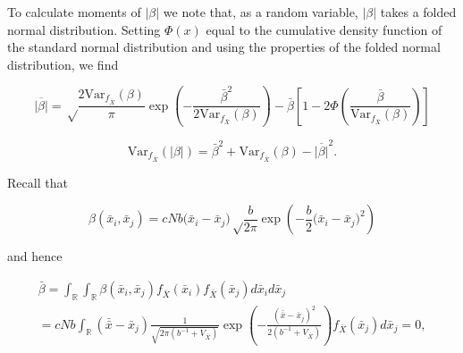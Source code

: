 \documentclass[]{article}
\begin{document}
To calculate moments of \(|\beta|\) we note that, as a random variable,
\(|\beta|\) takes a folded normal distribution. Setting \(\Phi(x)\)
equal to the cumulative density function of the standard normal
distribution and using the properties of the folded normal distribution,
we find

\begin{equation}
\overline{|\beta|}=\sqrt\frac{2\mathrm{Var}_{f_{\bar X}}(\beta)}{\pi}\exp\left(-\frac{\bar\beta^2}{2\mathrm{Var}_{f_{\bar X}}(\beta)}\right)-\bar\beta\left[1-2\Phi\left(\frac{\bar\beta}{\mathrm{Var}_{f_{\bar X}}(\beta)}\right)\right]
\end{equation}

\begin{equation}
\mathrm{Var}_{f_{\bar X}}(|\beta|)=\bar\beta^2+\mathrm{Var}_{f_{\bar X}}(\beta)-\overline{|\beta|}^2.
\end{equation}

Recall that

\begin{equation}
\beta(\bar x_i,\bar x_j)=cNb\big(\bar x_i-\bar x_j\big)\sqrt\frac{b}{2\pi}\exp\left(-\frac{b}{2}\big(\bar x_i-\bar x_j\big)^2\right)
\end{equation}

and hence

\begin{multline}
\bar\beta=
\int_\mathbb{R}\int_\mathbb{R}\beta(\bar x_i,\bar x_j)f_{\bar X}(\bar x_i)f_{\bar X}(\bar x_j)d\bar x_id\bar x_j \\
= cNb\int_\mathbb{R}(\bar{\bar x}-\bar x_j)\frac{1}{\sqrt{2\pi(b^{-1}+V_{\bar X})}}\exp\left(-\frac{(\bar{\bar x}-\bar x_j)^2}{2(b^{-1}+V_{\bar X})}\right)f_{\bar X}(\bar x_j)d\bar x_j=0,
\end{multline}
\end{document}
